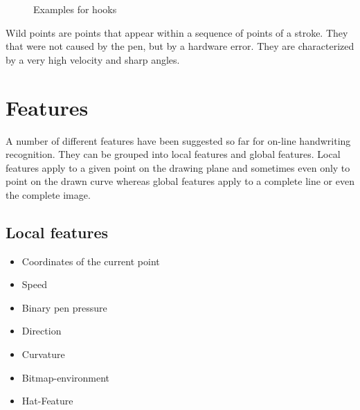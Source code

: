 \begin{figure}[ht]
    \centering
    \caption{Examples for hooks}
    \label{fig:hooks}
\end{figure}

Wild points are points that appear within a sequence of points of a stroke. They
that were not caused by the pen, but by a hardware error. They are characterized
by a very high velocity and sharp angles.

\section{Features}\label{sec:features}
A number of different features have been suggested so far for on-line handwriting
recognition. They can be grouped into local features and global features.
Local features apply to a given point on the drawing plane and sometimes even
only to point on the drawn curve whereas global features apply to a complete
line or even the complete image.

\subsection{Local features}
\begin{itemize}
    \item Coordinates of the current point\cite{Guyon91}
    \item Speed\cite{Huang09,ICASSP-94}
    \item Binary pen pressure\cite{Kosmala98,Kosmala11,ICASSP-94}
    \item Direction\cite{Manke95,Huang06}
    \item Curvature\cite{Groner66,Manke95,ICASSP-94,Guyon91}
    \item Bitmap-environment\cite{Manke95}
    \item Hat-Feature\cite{ICASSP-94,Manke00}
\end{itemize}

